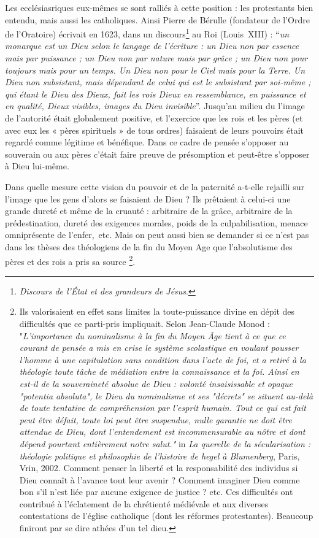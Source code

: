 Les ecclésiasriques eux-mêmes se sont ralliés à cette position : les protestants bien entendu, mais aussi les catholiques. Ainsi Pierre de Bérulle (fondateur de l'Ordre de l'Oratoire) écrivait en 1623, dans un discours\footnote{\emph{Discours de l'État et des grandeurs de Jésus}.} au Roi (Louis~XIII)  :
    \enquote{\emph{un monarque est un Dieu selon le langage de l'écriture : un Dieu non par essence mais par puissance ; un Dieu non par nature mais par grâce ; un Dieu non pour toujours mais pour un temps. Un Dieu non pour le Ciel mais pour la Terre. Un Dieu non subsistant, mais dépendant de celui qui est le subsistant par soi-même ; qui étant le Dieu des Dieux, fait les rois Dieux en ressemblance, en puissance et en qualité, Dieux visibles, images du Dieu invisible}}. Jusqu'au milieu du  l'image de l'autorité était globalement positive, et l'exercice que les rois et les pères (et avec eux les « pères spirituels » de tous ordres) faisaient de leurs pouvoirs était regardé comme légitime et bénéfique. Dans ce cadre de pensée s'opposer au souverain ou aux pères c'était faire preuve de présomption et peut-être s'opposer à Dieu lui-même. 
    
    Dans quelle mesure cette vision du pouvoir et de la paternité a-t-elle rejailli sur l'image que les gens d'alors se faisaient de Dieu ? Ils prêtaient à celui-ci une grande dureté et même de la cruauté : arbitraire de la grâce, arbitraire de la prédestination, dureté des exigences morales, poids de la culpabilisation, menace omniprésente de l'enfer,~etc. Mais on peut aussi bien se demander si ce n'est pas  dans les thèses des théologiens de la fin du Moyen Age que l'absolutisme des pères et des rois a pris sa source \footnote{Ils valorisaient en effet sans limites la toute-puissance divine en dépit des difficultés que ce parti-pris impliquait. Selon Jean-Claude Monod : "\emph{L'importance du nominalisme à la fin du Moyen Âge tient à ce que ce courant de pensée a mis en crise le système scolastique en voulant pousser l'homme à une capitulation sans condition dans l'acte de foi, et a retiré à la théologie toute tâche de médiation entre la connaissance et la foi. Ainsi en est-il de la souveraineté absolue de Dieu : volonté insaisissable et opaque "potentia absoluta", le Dieu du nominalisme et ses "décrets" se situent au-delà de toute tentative de compréhension par l'esprit humain. Tout ce qui est fait peut être défait, toute loi peut être suspendue, nulle garantie ne doit être attendue de Dieu, dont l'entendement est incommensurable au nôtre et dont dépend pourtant entièrement notre salut."} in \emph{La querelle de la sécularisation : théologie politique et philosophie de l'histoire de hegel à Blumenberg}, Paris, Vrin, 2002. Comment penser la liberté et la responsabilité des individus si Dieu connaît à l'avance tout leur avenir ? Comment imaginer Dieu comme bon s'il n'est liée par aucune exigence de justice ? etc. Ces difficultés ont contribué à l'éclatement de la chrétienté médiévale et aux diverses contestations de l'église catholique (dont les réformes protestantes). Beaucoup finiront par se dire athées d'un tel dieu.}.       
    
